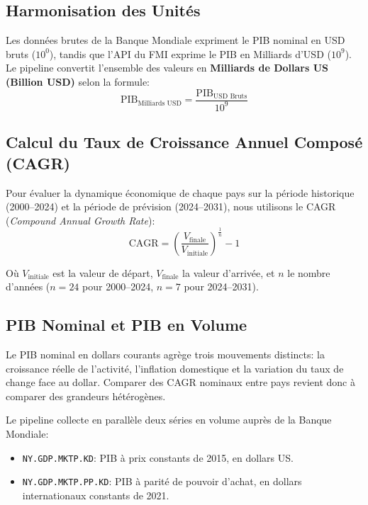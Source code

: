 \documentclass[11pt,a4paper]{article}
\begin{document}
\subsection{Harmonisation des Unités}
Les données brutes de la Banque Mondiale expriment le PIB nominal en USD bruts ($10^0$), tandis que l'API du FMI exprime le PIB en Milliards d'USD ($10^9$). Le pipeline convertit l'ensemble des valeurs en \textbf{Milliards de Dollars US (Billion USD)} selon la formule:
\begin{equation}
\text{PIB}_{\text{Milliards USD}} = \frac{\text{PIB}_{\text{USD Bruts}}}{10^9}
\end{equation}

\subsection{Calcul du Taux de Croissance Annuel Composé (CAGR)}
Pour évaluer la dynamique économique de chaque pays sur la période historique (2000--2024) et la période de prévision (2024--2031), nous utilisons le CAGR (\textit{Compound Annual Growth Rate}):
\begin{equation}
\text{CAGR} = \left( \frac{V_{\text{finale}}}{V_{\text{initiale}}} \right)^{\frac{1}{n}} - 1
\end{equation}

Où $V_{\text{initiale}}$ est la valeur de départ, $V_{\text{finale}}$ la valeur d'arrivée, et $n$ le nombre d'années ($n = 24$ pour 2000--2024, $n = 7$ pour 2024--2031).

\subsection{PIB Nominal et PIB en Volume}
Le PIB nominal en dollars courants agrège trois mouvements distincts: la croissance réelle de l'activité, l'inflation domestique et la variation du taux de change face au dollar. Comparer des CAGR nominaux entre pays revient donc à comparer des grandeurs hétérogènes.

Le pipeline collecte en parallèle deux séries en volume auprès de la Banque Mondiale:
\begin{itemize}
    \item \texttt{NY.GDP.MKTP.KD}: PIB à prix constants de 2015, en dollars US.
    \item \texttt{NY.GDP.MKTP.PP.KD}: PIB à parité de pouvoir d'achat, en dollars internationaux constants de 2021.
\end{itemize}
\end{document}
